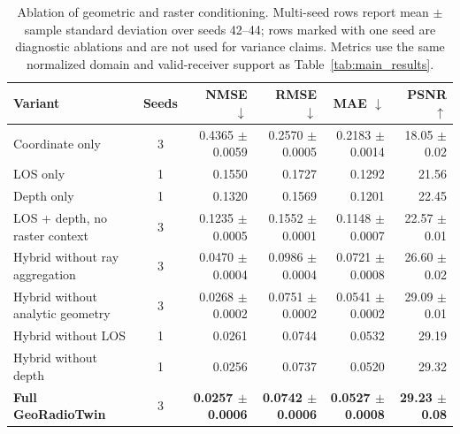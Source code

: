 \begin{table}[t]
\centering
\caption{Ablation of geometric and raster conditioning. Multi-seed rows report mean $\pm$ sample standard deviation over seeds 42--44; rows marked with one seed are diagnostic ablations and are not used for variance claims. Metrics use the same normalized domain and valid-receiver support as Table~\ref{tab:main_results}.}
\label{tab:ablation}
\setlength{\tabcolsep}{5pt}
\begin{tabular}{lcrrrr}
\toprule
Variant & Seeds & NMSE $\downarrow$ & RMSE $\downarrow$ & MAE $\downarrow$ & PSNR $\uparrow$ \\
\midrule
Coordinate only & 3 & 0.4365 $\pm$ 0.0059 & 0.2570 $\pm$ 0.0005 & 0.2183 $\pm$ 0.0014 & 18.05 $\pm$ 0.02 \\
LOS only & 1 & 0.1550 & 0.1727 & 0.1292 & 21.56 \\
Depth only & 1 & 0.1320 & 0.1569 & 0.1201 & 22.45 \\
LOS + depth, no raster context & 3 & 0.1235 $\pm$ 0.0005 & 0.1552 $\pm$ 0.0001 & 0.1148 $\pm$ 0.0007 & 22.57 $\pm$ 0.01 \\
Hybrid without ray aggregation & 3 & 0.0470 $\pm$ 0.0004 & 0.0986 $\pm$ 0.0004 & 0.0721 $\pm$ 0.0008 & 26.60 $\pm$ 0.02 \\
Hybrid without analytic geometry & 3 & 0.0268 $\pm$ 0.0002 & 0.0751 $\pm$ 0.0002 & 0.0541 $\pm$ 0.0002 & 29.09 $\pm$ 0.01 \\
Hybrid without LOS & 1 & 0.0261 & 0.0744 & 0.0532 & 29.19 \\
Hybrid without depth & 1 & 0.0256 & 0.0737 & 0.0520 & 29.32 \\
\textbf{Full GeoRadioTwin} & 3 & \textbf{0.0257 $\pm$ 0.0006} & \textbf{0.0742 $\pm$ 0.0006} & \textbf{0.0527 $\pm$ 0.0008} & \textbf{29.23 $\pm$ 0.08} \\
\bottomrule
\end{tabular}
\end{table}
